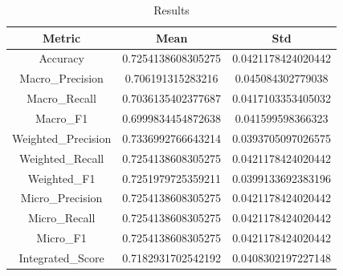 \begin{table}[htbp]
\centering
\caption{Results}
\label{tab:csv}
\small
\setlength{\tabcolsep}{4pt}
\begin{tabular}{|c|c|c|}
\hline
Metric & Mean & Std \\
\hline
Accuracy & 0.7254138608305275 & 0.0421178424020442 \\
Macro_Precision & 0.706191315283216 & 0.045084302779038 \\
Macro_Recall & 0.7036135402377687 & 0.0417103353405032 \\
Macro_F1 & 0.6999834454872638 & 0.041599598366323 \\
Weighted_Precision & 0.7336992766643214 & 0.0393705097026575 \\
Weighted_Recall & 0.7254138608305275 & 0.0421178424020442 \\
Weighted_F1 & 0.7251979725359211 & 0.0399133692383196 \\
Micro_Precision & 0.7254138608305275 & 0.0421178424020442 \\
Micro_Recall & 0.7254138608305275 & 0.0421178424020442 \\
Micro_F1 & 0.7254138608305275 & 0.0421178424020442 \\
Integrated_Score & 0.7182931702542192 & 0.0408302197227148 \\
\hline
\end{tabular}
\end{table}
